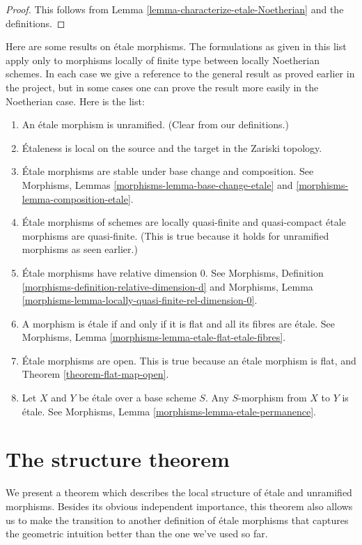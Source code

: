 \begin{proof}
This follows from Lemma \ref{lemma-characterize-etale-Noetherian}
and the definitions.
\end{proof}

\noindent
Here are some results on \'etale morphisms.
The formulations as given in this list apply only to
morphisms locally of finite type between locally Noetherian schemes.
In each case we give a reference to the general result as
proved earlier in the project, but in some cases one can
prove the result more easily in the Noetherian case.
Here is the list:
\begin{enumerate}
\item An \'etale morphism is unramified. (Clear from our definitions.)
\item \'Etaleness is local on the source and the target in the Zariski
topology.
\item \'Etale morphisms are stable under base change and composition.
See Morphisms, Lemmas \ref{morphisms-lemma-base-change-etale}
and \ref{morphisms-lemma-composition-etale}.
\item \'Etale morphisms of schemes are locally quasi-finite
and quasi-compact \'etale morphisms are quasi-finite. (This is
true because it holds for unramified morphisms as seen earlier.)
\item \'Etale morphisms have relative dimension $0$. See
Morphisms, Definition \ref{morphisms-definition-relative-dimension-d}
and
Morphisms, Lemma \ref{morphisms-lemma-locally-quasi-finite-rel-dimension-0}.
\item A morphism is \'etale if and only if it is flat and
all its fibres are \'etale. See
Morphisms, Lemma \ref{morphisms-lemma-etale-flat-etale-fibres}.
\item \'Etale morphisms are open. This is true because an \'etale
morphism is flat, and Theorem \ref{theorem-flat-map-open}.
\item Let $X$ and $Y$ be \'etale over a base scheme $S$.
Any $S$-morphism from $X$ to $Y$ is \'etale.
See Morphisms, Lemma \ref{morphisms-lemma-etale-permanence}.
\end{enumerate}






\section{The structure theorem}
\label{section-structure-etale-map}

\noindent
We present a theorem which describes the local structure of \'etale
and unramified morphisms. Besides its obvious independent importance,
this theorem also allows us to make the transition to another
definition of \'etale morphisms that captures the geometric intuition better
than the one we've used so far.

